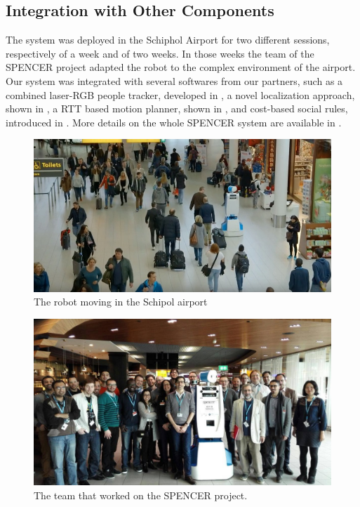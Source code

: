 \subsection{Integration with Other Components}
The system was deployed in the Schiphol Airport for two different sessions, respectively of a week and of two weeks. In those weeks the team of the SPENCER project adapted the robot to the complex environment of the airport. Our system was integrated with several softwares from our partners, such as a combined laser-RGB people tracker, developed in \cite{lindermulti}, a novel localization approach, shown in \cite{kucner2015ndt}, a RTT based motion planner, shown in \cite{palmierirrt}, and cost-based social rules, introduced in \cite{okallearning}. More details on the whole SPENCER system are available in \cite{triebel2015spencer}.


\begin{figure}[ht!]
	\centering
	\includegraphics[scale=0.45]{img/case_study/spencer/spencer_schiphol.png}
	\caption{The robot moving in the Schipol airport}
	\label{fig:case_study-spencer-spencer_moving}
\end{figure}


\begin{figure}[ht!]
	\centering
	\includegraphics[scale=0.45]{img/case_study/spencer/all.jpg}
	\caption{The team that worked on the SPENCER project.}
	\label{fig:case_study-spencer-team}
\end{figure}

